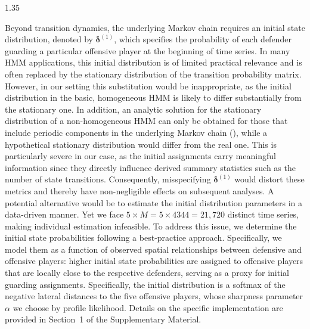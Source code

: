 \documentclass[12pt,a4paper]{article}
\begin{document}
\begin{spacing}{1.35}

Beyond transition dynamics, the underlying Markov chain requires an initial state distribution, denoted by $\boldsymbol{\delta}^{(1)}$, which specifies the probability of each defender guarding a particular offensive player at the beginning of time series. In many HMM applications, this initial distribution is of limited practical relevance and is often replaced by the stationary distribution of the transition probability matrix.
However, in our setting this substitution would be inappropriate, as the initial distribution in the basic, homogeneous HMM is likely to differ substantially from the stationary one. In addition, an analytic solution for the stationary distribution of a non-homogeneous HMM can only be obtained for those that include periodic components in the underlying Markov chain (\citealp{koslik2025inference}), while a hypothetical stationary distribution would differ from the real one. This is particularly severe in our case, as the initial assignments carry meaningful information since they directly influence derived summary statistics such as the number of state transitions. Consequently, misspecifying $\boldsymbol{\delta}^{(1)}$ would distort these metrics and thereby have non-negligible effects on subsequent analyses. 
A potential alternative would be to estimate the initial distribution parameters in a data-driven manner. Yet we face $5 \times M = 5 \times 4344 = 21{,}720$ distinct time series, making individual estimation infeasible. To address this issue, we determine the initial state probabilities following a best-practice approach. Specifically, we model them as a function of observed spatial relationships between defensive and offensive players: higher initial state probabilities are assigned to offensive players that are locally close to the respective defenders, serving as a proxy for initial guarding assignments. Specifically, the initial distribution is a softmax of the negative lateral distances to the five offensive players, whose sharpness parameter $\alpha$ we choose by profile likelihood. Details on the specific implementation are provided in Section~1 of the Supplementary Material.


\end{spacing}
\end{document}
